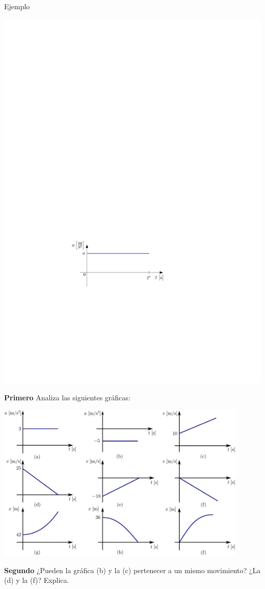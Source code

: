 \begin{example}{Ejemplo}
\begin{center}
    \includegraphics[]{img/plot2c.pdf}
  \end{center}
\end{example}


\begin{comprension}
  \noindent
  {\bf Primero}  Analiza las siguientes gráficas:
  \begin{center}
    \includegraphics[width=0.9\textwidth]{img/analisisMRUV.pdf}
  \end{center}

 \noindent
  {\bf Segundo} ¿Pueden la gráfica (b) y la (c) pertenecer a un mismo movimiento? ¿La (d) y la (f)? Explica.
\end{comprension}
